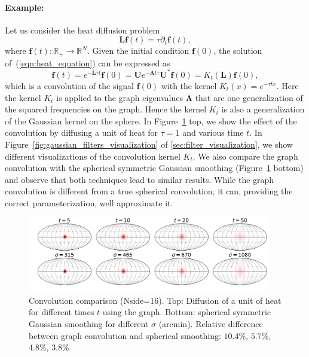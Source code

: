 \documentclass[final,twocolumn,3p,times,authoryear]{elsarticle}
\newcommand{\figref}[1]{Figure~\ref{fig:#1}}
\newcommand{\eqnref}[1]{(\ref{eqn:#1})}
\renewcommand{\b}[1]{{\bm{#1}}}   %
\newcommand{\1}{\b{1}}              %
\newcommand{\0}{\b{0}}              %
\newcommand{\g}[1]{\b{#1}}
\renewcommand{\L}{\b{L}} %
\newcommand{\U}{\b{U}}
\newcommand{\bLambda}{\b{\Lambda}}
\begin{document}
\paragraph{Example:}
Let us consider the heat diffusion problem
\begin{equation} \label{eqn:heat_equation}
\L \b{f}(t) = \tau \partial_t \b{f}(t),
\end{equation}
where $\b{f}(t): \mathbb{R}_+ \rightarrow \mathbb{R}^N$. Given the initial condition
$\b{f}(0)$, the solution of~\eqnref{heat_equation} can be expressed as
\begin{equation}
\b{f}(t) = e^{-\L \tau t} \b{f}(0) = \U e^{-\bLambda t \tau} \U^* \g{f}(0) = K_t(\L) \b{f}(0),
\end{equation}
which is a convolution of the signal $\b{f}(0)$ with the kernel $K_t(x)=e^{-\tau
t x}$. Here the kernel $K_t$ is applied to the graph eigenvalues $\bLambda$ that
are one generalization of the squared frequencies on the graph. Hence the kernel $K_t$ is also a generalization of the
Gaussian kernel on the sphere. In \figref{gaussian_filters_comparizon} top, we show
the effect of the convolution by diffusing a unit of heat for $\tau=1$ and various
time $t$. In \figref{gaussian_filters_visualization} of
\ref{sec:filter_visualization}, we show different visualizations of the
convolution kernel $K_t$. We also compare the graph convolution with the
spherical symmetric Gaussian smoothing
(\figref{gaussian_filters_comparizon} bottom) and observe that both
techniques lead to similar results. While the graph convolution is different
from a true spherical convolution, it can, providing the correct
parameterization, well approximate it.

\begin{figure}[!ht]
\centering
\includegraphics[width=0.95\textwidth]{figures/gaussian_filters_sphere.pdf}
\caption{Convolution comparison (Nside=16).
Top: Diffusion of a unit of heat for different times $t$ using the graph.
Bottom: spherical symmetric Gaussian smoothing for different $\sigma$ (arcmin).
Relative difference between graph convolution and spherical smoothing: $10.4$\%, $5.7$\%, $4.8$\%, $3.8$\% }
\label{fig:gaussian_filters_comparizon}
\end{figure}
\end{document}
